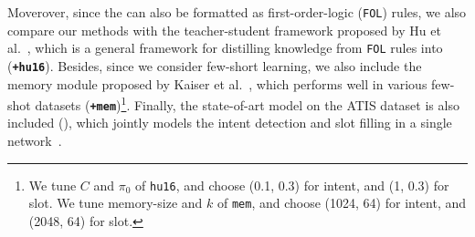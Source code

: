 Moverover, since the \REs can also be formatted as first-order-logic (\texttt{FOL}) rules, we also compare our methods with the
teacher-student framework proposed by Hu et al.~, which is a general framework for distilling knowledge from
\texttt{FOL} rules into \NN (\textbf{\texttt{+hu16}}). Besides, since we consider few-short learning,  we also include the memory module
proposed by Kaiser et al.~, which performs well in various few-shot datasets
(\textbf{\texttt{+mem}})\footnote{
	We tune $C$ and $\pi_0$ of \texttt{hu16}, and choose (0.1, 0.3) for intent, and (1, 0.3) for slot. We tune memory-size and $k$ of
\texttt{mem}, and choose (1024, 64) for intent, and (2048, 64) for slot. }. Finally, the state-of-art model on the ATIS dataset is also
included (\textbf{\LL}), which jointly models the intent detection and slot filling in a single network~\cite{liu2016attention}.


